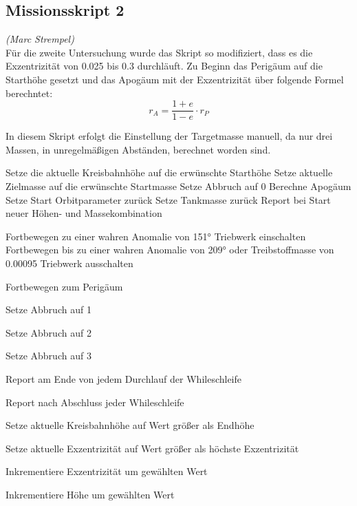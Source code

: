
\subsection{Missionsskript 2}
\hfill\emph{(Marc Strempel)}\\
Für die zweite Untersuchung wurde das Skript so modifiziert, dass es die Exzentrizität von \num{0.025} bis \num{0.3} durchläuft.
Zu Beginn das Perigäum auf die Starthöhe gesetzt und das Apogäum mit der Exzentrizität über folgende Formel berechntet:\\
\begin{equation}
r_A = \frac{1+e}{1-e}\cdot r_P
\label{apoapsis}
\end{equation}

In diesem Skript erfolgt die Einstellung der Targetmasse manuell, da nur drei Massen, in unregelmäßigen Abständen, berechnet worden sind.\\

\begin{algorithmic}

\STATE Setze die aktuelle Kreisbahnhöhe auf die erwünschte Starthöhe
\STATE Setze aktuelle Zielmasse auf die erwünschte Startmasse
\STATE Setze Abbruch auf 0
\STATE Berechne Apogäum
\STATE Setze Start Orbitparameter zurück
\STATE Setze Tankmasse zurück
\RETURN Report bei Start neuer Höhen- und Massekombination


\STATE Fortbewegen zu einer wahren Anomalie von 151°
\STATE Triebwerk einschalten
\STATE Fortbewegen bis zu einer wahren Anomalie von 209° oder Treibstoffmasse von 0.00095 
\STATE Triebwerk ausschalten
\ENDIF

\STATE Fortbewegen zum Perigäum
\ENDIF

\STATE Setze Abbruch auf 1
\ENDIF

\STATE Setze Abbruch auf 2
\ENDIF

\STATE Setze Abbruch auf 3
\ENDIF

\RETURN Report am Ende von jedem Durchlauf der Whileschleife
\ENDWHILE

\RETURN Report nach Abschluss jeder Whileschleife


\STATE Setze aktuelle Kreisbahnhöhe auf Wert größer als Endhöhe 
\ENDIF

\STATE Setze aktuelle Exzentrizität auf Wert größer als höchste Exzentrizität
\ENDIF

\STATE Inkrementiere Exzentrizität um gewählten Wert
\ENDWHILE

\STATE Inkrementiere Höhe um gewählten Wert
\ENDWHILE

\end{algorithmic}


